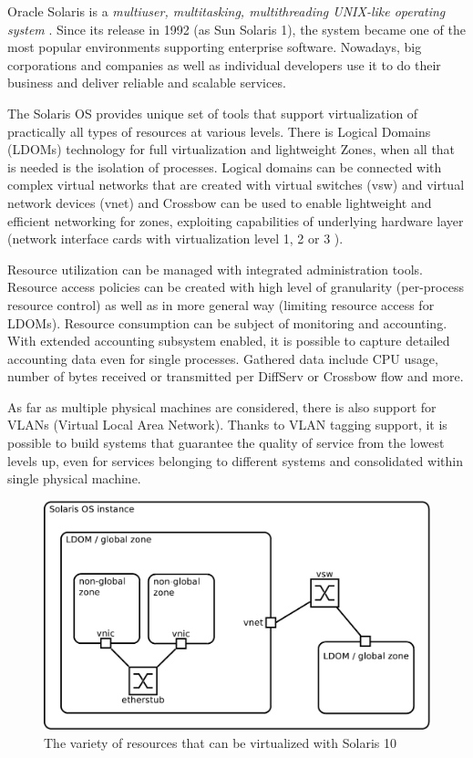 \documentclass[11pt]{book}
\begin{document}
      Oracle Solaris is a \textit{multiuser, multitasking, multithreading UNIX-like operating system} \cite{reference}.
      Since its release in 1992 (as Sun Solaris 1), the system became one of the most popular environments supporting
      enterprise software. Nowadays, big corporations and companies as well as individual developers use it to do their
      business and deliver reliable and scalable services.

      The Solaris OS provides unique set of tools that support virtualization of practically all types of resources at
      various levels. There is Logical Domains (LDOMs) technology for full virtualization and lightweight Zones, when
      all that is needed is the isolation of processes. Logical domains can be connected with complex virtual networks
      that are created with virtual switches (vsw) and virtual network devices (vnet) \cite{ldomag} and Crossbow can be
      used to enable lightweight and efficient networking for zones, exploiting capabilities of underlying hardware
      layer (network interface cards with virtualization level 1, 2 or 3 \cite{santos}).

      Resource utilization can be managed with integrated administration tools. Resource access policies can be created
      with high level of granularity (per-process resource control) as well as in more general way (limiting resource
      access for LDOMs). Resource consumption can be subject of monitoring and accounting. With extended accounting
      subsystem enabled, it is possible to capture detailed accounting data even for single processes. Gathered data
      include CPU usage, number of bytes received or transmitted per DiffServ or Crossbow flow and more.

      As far as multiple physical machines are considered, there is also support for VLANs (Virtual Local Area Network).
      Thanks to VLAN tagging support, it is possible to build systems that guarantee the quality of service from the
      lowest levels up, even for services belonging to different systems and consolidated within single physical machine.

      \begin{figure}[H]
        \begin{center}
          \includegraphics[width=.7\textwidth]{img/solaris/full-featured.pdf}
        \end{center}

        \caption{The variety of resources that can be virtualized with Solaris 10}
      \end{figure}
\end{document}
